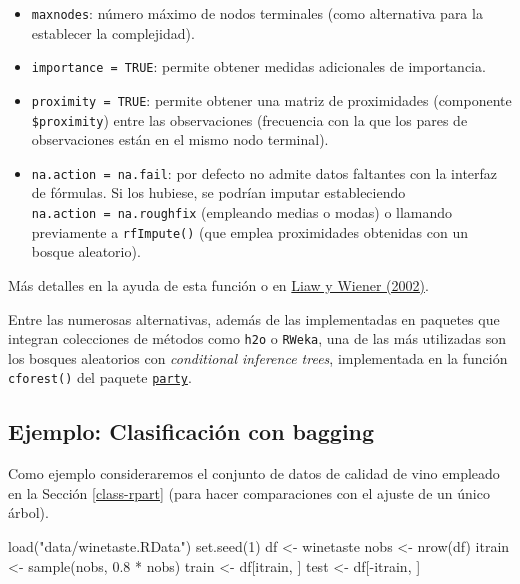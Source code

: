 \documentclass[
  spanish,
]{book}
\newenvironment{Shaded}{\begin{snugshade}}{\end{snugshade}}
\newcommand{\DecValTok}[1]{\textcolor[rgb]{0.00,0.00,0.81}{#1}}
\newcommand{\FloatTok}[1]{\textcolor[rgb]{0.00,0.00,0.81}{#1}}
\newcommand{\FunctionTok}[1]{\textcolor[rgb]{0.00,0.00,0.00}{#1}}
\newcommand{\NormalTok}[1]{#1}
\newcommand{\OtherTok}[1]{\textcolor[rgb]{0.56,0.35,0.01}{#1}}
\newcommand{\SpecialCharTok}[1]{\textcolor[rgb]{0.00,0.00,0.00}{#1}}
\newcommand{\StringTok}[1]{\textcolor[rgb]{0.31,0.60,0.02}{#1}}
\theoremstyle{break}
\theoremstyle{definition}
\theoremstyle{definition}
\theoremstyle{definition}
\theoremstyle{definition}
\theoremstyle{remark}
\begin{document}
\begin{itemize}
\item
  \texttt{maxnodes}: número máximo de nodos terminales (como alternativa para la establecer la complejidad).
\item
  \texttt{importance\ =\ TRUE}: permite obtener medidas adicionales de importancia.
\item
  \texttt{proximity\ =\ TRUE}: permite obtener una matriz de proximidades (componente \texttt{\$proximity}) entre las observaciones (frecuencia con la que los pares de observaciones están en el mismo nodo terminal).
\item
  \texttt{na.action\ =\ na.fail}: por defecto no admite datos faltantes con la interfaz de fórmulas. Si los hubiese, se podrían imputar estableciendo \texttt{na.action\ =\ na.roughfix} (empleando medias o modas) o llamando previamente a \texttt{rfImpute()} (que emplea proximidades obtenidas con un bosque aleatorio).
\end{itemize}

Más detalles en la ayuda de esta función o en \href{https://www.r-project.org/doc/Rnews/Rnews_2002-3.pdf}{Liaw y Wiener (2002)}.

Entre las numerosas alternativas, además de las implementadas en paquetes que integran colecciones de métodos como \texttt{h2o} o \texttt{RWeka}, una de las más utilizadas son los bosques aleatorios con \emph{conditional inference trees}, implementada en la función \texttt{cforest()} del paquete \href{https://CRAN.R-project.org/package=party}{\texttt{party}}.

\hypertarget{ejemplo-clasificaciuxf3n-con-bagging}{%
\subsection{Ejemplo: Clasificación con bagging}\label{ejemplo-clasificaciuxf3n-con-bagging}}

Como ejemplo consideraremos el conjunto de datos de calidad de vino empleado en la Sección \ref{class-rpart} (para hacer comparaciones con el ajuste de un único árbol).

\begin{Shaded}
\begin{Highlighting}[]
\FunctionTok{load}\NormalTok{(}\StringTok{"data/winetaste.RData"}\NormalTok{)}
\FunctionTok{set.seed}\NormalTok{(}\DecValTok{1}\NormalTok{)}
\NormalTok{df }\OtherTok{\textless{}{-}}\NormalTok{ winetaste}
\NormalTok{nobs }\OtherTok{\textless{}{-}} \FunctionTok{nrow}\NormalTok{(df)}
\NormalTok{itrain }\OtherTok{\textless{}{-}} \FunctionTok{sample}\NormalTok{(nobs, }\FloatTok{0.8} \SpecialCharTok{*}\NormalTok{ nobs)}
\NormalTok{train }\OtherTok{\textless{}{-}}\NormalTok{ df[itrain, ]}
\NormalTok{test }\OtherTok{\textless{}{-}}\NormalTok{ df[}\SpecialCharTok{{-}}\NormalTok{itrain, ]}
\end{Highlighting}
\end{Shaded}
\end{document}
